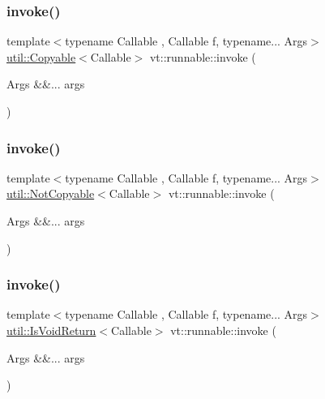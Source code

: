 \subsubsection{\texorpdfstring{invoke()}{invoke()}\hspace{0.1cm}{\footnotesize\ttfamily [1/3]}}
{\footnotesize\ttfamily template$<$typename Callable , Callable f, typename... Args$>$ \\
\hyperlink{namespacevt_1_1util_ae9a553985cdc8e9bd4e55f55161f2929}{util\+::\+Copyable}$<$Callable$>$ vt\+::runnable\+::invoke (\begin{DoxyParamCaption}\item[{Args \&\&...}]{args }\end{DoxyParamCaption})}

\mbox{\label{namespacevt_1_1runnable_aa86b7892ea9590c2e8fef9ed0ca4e80c}} 
\subsubsection{\texorpdfstring{invoke()}{invoke()}\hspace{0.1cm}{\footnotesize\ttfamily [2/3]}}
{\footnotesize\ttfamily template$<$typename Callable , Callable f, typename... Args$>$ \\
\hyperlink{namespacevt_1_1util_a0760a3963341a602dfe2dfc42d78c867}{util\+::\+Not\+Copyable}$<$Callable$>$ vt\+::runnable\+::invoke (\begin{DoxyParamCaption}\item[{Args \&\&...}]{args }\end{DoxyParamCaption})}

\mbox{\label{namespacevt_1_1runnable_ad7a4c11af0d8864939dca87f89fba1cb}} 
\subsubsection{\texorpdfstring{invoke()}{invoke()}\hspace{0.1cm}{\footnotesize\ttfamily [3/3]}}
{\footnotesize\ttfamily template$<$typename Callable , Callable f, typename... Args$>$ \\
\hyperlink{namespacevt_1_1util_a97df3e28837417537b3bc035c74f064d}{util\+::\+Is\+Void\+Return}$<$Callable$>$ vt\+::runnable\+::invoke (\begin{DoxyParamCaption}\item[{Args \&\&...}]{args }\end{DoxyParamCaption})}

